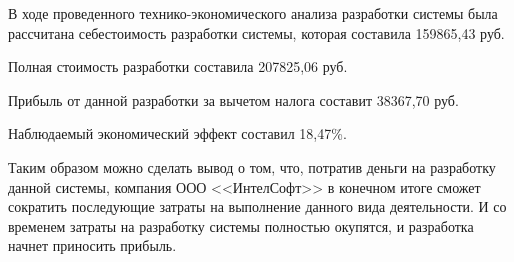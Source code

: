 В ходе проведенного технико-экономического анализа разработки системы была рассчитана себестоимость разработки системы, которая составила 159865,43 руб.

Полная стоимость разработки составила 207825,06 руб.

Прибыль от данной разработки за вычетом налога составит 38367,70 руб.

Наблюдаемый экономический эффект составил 18,47\%.

Таким образом можно сделать вывод о том, что, потратив деньги на разработку данной системы, компания ООО <<ИнтелСофт>> в конечном итоге сможет сократить последующие затраты на выполнение данного вида деятельности.
И со временем затраты на разработку системы полностью окупятся, и разработка начнет приносить прибыль.


\clearpage
\newpage
